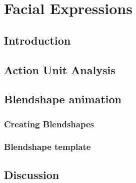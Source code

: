 \chapter{Facial Expressions}

\section{Introduction}

\section{Action Unit Analysis}

\section{Blendshape animation}

\subsection{Creating Blendshapes}

\subsection{Blendshape template}

\section{Discussion}
